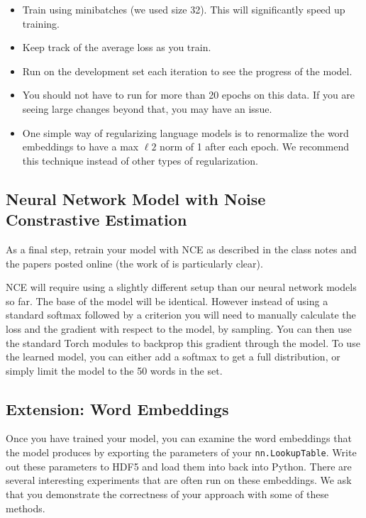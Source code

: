 \documentclass[11pt]{article}
\begin{document}
 \begin{itemize}
 \item Train using minibatches (we used size 32). This will significantly speed up training. 
 \item Keep track of the average loss as you train. 
 \item Run on the development set each iteration to see the progress of the model.
 \item You should not have to run for more than 20 epochs on this data. If you are seeing large 
   changes beyond that, you may have an issue. 
 \item One simple way of regularizing language models is to
   renormalize the word embeddings to have a max $\ell2$ norm of 1
   after each epoch. We recommend this technique instead of other
   types of regularization.

 \end{itemize}

\subsection{Neural Network Model with Noise Constrastive Estimation}

As a final step, retrain your model with NCE as described in the class notes 
and the papers posted online (the work of \citet{mnih2013learning} is particularly clear).

NCE will require using a slightly different setup than our neural
network models so far.  The base of the model will be identical.
However instead of using a standard softmax followed by a criterion you will
need to manually calculate the loss and the gradient with respect to
the model, by sampling. You can then use the standard Torch modules to
backprop this gradient through the model. To use the learned model,
you can either add a softmax to get a full distribution, or simply 
limit the model to the 50 words in the set. 
 

\subsection{Extension: Word Embeddings}

Once you have trained your model, you can examine the word embeddings that the model 
produces by exporting the parameters of your \texttt{nn.LookupTable}. Write out these 
parameters to HDF5 and load them into back into Python. There are several interesting 
experiments that are often run on these embeddings. We ask that you demonstrate the 
correctness of your approach with some of these methods.
\end{document}

